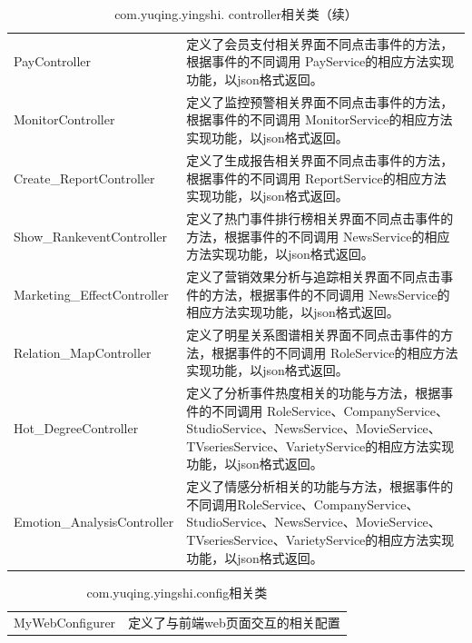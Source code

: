 \begin{table}
	\caption{com.yuqing.yingshi. controller相关类（续）}
	\centering
	\begin{tabular}{|p{4.5cm}|p{8.5cm}|} 
		\hline 
		\rowcolor[HTML]{DAE8FC} 
		\multicolumn{2}{|c|}{com.yuqing.yingshi. controller相关类} \\ 
		\hline 
PayController&定义了会员支付相关界面不同点击事件的方法，根据事件的不同调用 PayService的相应方法实现功能，以json格式返回。\\
MonitorController&定义了监控预警相关界面不同点击事件的方法，根据事件的不同调用 MonitorService的相应方法实现功能，以json格式返回。\\
Create\_ReportController&定义了生成报告相关界面不同点击事件的方法，根据事件的不同调用 ReportService的相应方法实现功能，以json格式返回。\\

Show\_RankeventController&定义了热门事件排行榜相关界面不同点击事件的方法，根据事件的不同调用 NewsService的相应方法实现功能，以json格式返回。\\
Marketing\_EffectController&定义了营销效果分析与追踪相关界面不同点击事件的方法，根据事件的不同调用 NewsService的相应方法实现功能，以json格式返回。\\
Relation\_MapController&定义了明星关系图谱相关界面不同点击事件的方法，根据事件的不同调用 RoleService的相应方法实现功能，以json格式返回。\\
Hot\_DegreeController&定义了分析事件热度相关的功能与方法，根据事件的不同调用 RoleService、CompanyService、StudioService、NewsService、MovieService、TVseriesService、VarietyService的相应方法实现功能，以json格式返回。\\
Emotion\_AnalysisController&定义了情感分析相关的功能与方法，根据事件的不同调用RoleService、CompanyService、StudioService、NewsService、MovieService、TVseriesService、VarietyService的相应方法实现功能，以json格式返回。\\
\hline 
\end{tabular}
\end{table}
\begin{table}
	\caption{com.yuqing.yingshi.config相关类}
	\centering
	\begin{tabular}{|p{4.5cm}|p{8.5cm}|} 
		\hline 
		\rowcolor[HTML]{DAE8FC} 
\multicolumn{2}{|c|}{com.yuqing.yingshi.config相关类} \\ 
\hline 
MyWebConfigurer& 定义了与前端web页面交互的相关配置\\
\hline 
\end{tabular}
\end{table}

